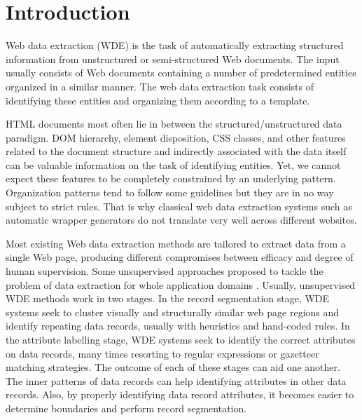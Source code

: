 \documentclass{nle}
\begin{document}

\maketitle

\section{Introduction}

Web data extraction (WDE) is the task of automatically extracting structured 
information from unstructured or semi-structured Web documents. The input 
usually consists of Web documents containing a number of predetermined entities 
organized in a similar manner. The web data extraction task consists of 
identifying these entities and organizing them according to a template. 

HTML documents most often lie in between the structured/unstructured 
data paradigm. DOM hierarchy, element disposition, CSS classes, and other 
features related to the document structure and indirectly associated with the 
data itself can be valuable information on the task of identifying
entities. Yet, we cannot expect these features to be completely constrained 
by an underlying pattern. Organization patterns tend to follow some guidelines 
but they are in no way subject to strict rules. That is why classical web data 
extraction systems such as automatic wrapper generators 
\cite{Kushmerick2000,Hsu1998,Muslea1999}
do not translate very well across different websites. 

Most existing Web data extraction methods are tailored to extract data 
from a single Web page, producing different compromises between efficacy and 
degree of human supervision. Some unsupervised approaches proposed to tackle 
the problem of data extraction for whole application domains 
\cite{Zhu2005,Zhu2006,Abdessalem2010,Furche2012,Furche2012a}. Usually, 
unsupervised WDE methods work in two stages. In the record segmentation stage,
WDE systems seek to cluster visually and structurally similar web page regions 
and identify repeating data records, usually with heuristics and 
hand-coded rules. In the attribute labelling stage, WDE systems seek to identify 
the correct attributes on data records, many times resorting to regular expressions 
or gazetteer matching strategies. The outcome of each of these stages can aid one 
another. The inner patterns of data records can help identifying attributes in other 
data records. Also, by properly identifying data record attributes, it becomes 
easier to determine boundaries and perform record segmentation.
\end{document}

